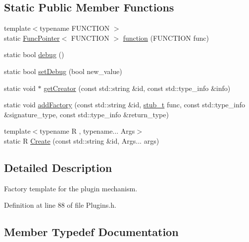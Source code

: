 \subsection*{Static Public Member Functions}
\begin{DoxyCompactItemize}
\item 
{\footnotesize template$<$typename F\+U\+N\+C\+T\+I\+ON $>$ }\\static \hyperlink{struct_d_d4hep_1_1_plugin_service_1_1_func_pointer}{Func\+Pointer}$<$ F\+U\+N\+C\+T\+I\+ON $>$ \hyperlink{class_d_d4hep_1_1_plugin_service_a2dab56b633f8a12cdf1e57295f7c01f6}{function} (F\+U\+N\+C\+T\+I\+ON func)
\item 
static bool \hyperlink{class_d_d4hep_1_1_plugin_service_a90761f21b553c0285eff00839dd912e8}{debug} ()
\item 
static bool \hyperlink{class_d_d4hep_1_1_plugin_service_a54147a8801746a0304f8b6c63aa0e083}{set\+Debug} (bool new\+\_\+value)
\item 
static void $\ast$ \hyperlink{class_d_d4hep_1_1_plugin_service_a63fcd240235468c6408563b0057c82df}{get\+Creator} (const std\+::string \&id, const std\+::type\+\_\+info \&info)
\item 
static void \hyperlink{class_d_d4hep_1_1_plugin_service_a55973b500e0191d1e843b7db9cfd37eb}{add\+Factory} (const std\+::string \&id, \hyperlink{class_d_d4hep_1_1_plugin_service_aa370cd45b770eaabf326eeaa91019382}{stub\+\_\+t} func, const std\+::type\+\_\+info \&signature\+\_\+type, const std\+::type\+\_\+info \&return\+\_\+type)
\item 
{\footnotesize template$<$typename R , typename... Args$>$ }\\static R \hyperlink{class_d_d4hep_1_1_plugin_service_adcd75004d9f818c73a15c0438db95515}{Create} (const std\+::string \&id, Args... args)
\end{DoxyCompactItemize}


\subsection{Detailed Description}
Factory template for the plugin mechanism. 

Definition at line 88 of file Plugins.\+h.



\subsection{Member Typedef Documentation}
\hypertarget{class_d_d4hep_1_1_plugin_service_aa370cd45b770eaabf326eeaa91019382}{}\label{class_d_d4hep_1_1_plugin_service_aa370cd45b770eaabf326eeaa91019382} 
